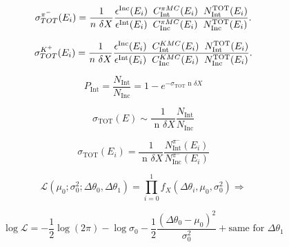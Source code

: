 \documentclass[letterpaper,12pt]{yalephd}
\begin{document}
\begin{equation}
      \sigma^{\pi^-}_{TOT}(E_{i})  = \frac{1}{n\text{ } \delta X}\frac{ \epsilon^{\text{Inc}}(E_i)  \hspace{0.2cm} C^{\pi MC}_{\text{Int}} (E_{i}) \hspace{0.2cm} N^{\text{TOT}}_{\text{Int}} (E_{i}) }{   \epsilon^{\text{Int}}(E_i) \hspace{0.2cm} C^{\pi MC}_{\text{Inc}} (E_{i}) \hspace{0.2cm}  N^{\text{TOT}}_{\text{Inc}} (E_{i})}.
\label{eq:C}
\end{equation}

\begin{equation}
      \sigma^{K^+}_{TOT}(E_{i})  = \frac{1}{n\text{ } \delta X}\frac{ \epsilon^{\text{Inc}}(E_i)  \hspace{0.2cm} C^{K MC}_{\text{Int}} (E_{i}) \hspace{0.2cm} N^{\text{TOT}}_{\text{Int}} (E_{i}) }{   \epsilon^{\text{Int}}(E_i) \hspace{0.2cm} C^{K MC}_{\text{Inc}} (E_{i}) \hspace{0.2cm}  N^{\text{TOT}}_{\text{Inc}} (E_{i})}.
\label{eq:C}
\end{equation}


\begin{equation}
P_\text{Int} = \frac{N_\text{Int}}{N_\text{Inc}} = 1 - e^{-\sigma_\text{TOT} \text{ n }\delta X} 
\end{equation}


\begin{equation}
\sigma_\text{TOT}(E)  \sim \frac{1}{\text{ n }\delta X} \frac{N_\text{Int}}{N_\text{Inc}}
\end{equation}


\begin{equation}
\sigma_\text{TOT}(E_i)  = \frac{1}{\text{ n }\delta X} \frac{N^{\pi^-}_\text{Int}(E_i)}{N^{\pi^-}_\text{Inc}(E_i)}
\end{equation}


\begin{equation}
\mathcal{L}(\mu_0; \sigma^2_0; \Delta\theta_0, \Delta\theta_1) = \prod^1_{i=0} f_X(\Delta\theta_i, \mu_0, \sigma^2_0 ) \Rightarrow 
\end{equation}

\begin{equation}\log{\mathcal{L}} = -\frac{1}{2}\log(2\pi) - \log{\sigma_0} - \frac{1}{2}\frac{(\Delta\theta_0 - \mu_0)^2}{\sigma^2_0} + \text{same for $\Delta\theta_1$}
\end{equation}
\end{document}
